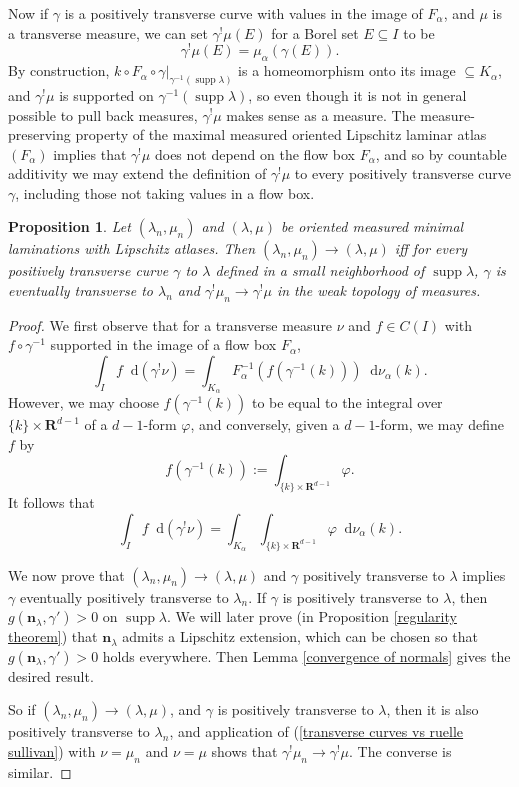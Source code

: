 \documentclass[reqno,11pt]{amsart}
\newcommand{\RR}{\mathbf{R}}
\newcommand*\dif{\mathop{}\!\mathrm{d}}
\DeclareMathOperator{\supp}{supp}
\newcommand{\normal}{\mathbf n}
\newtheorem{proposition}[theorem]{Proposition}
\theoremstyle{definition}
\numberwithin{equation}{section}
\begin{document}
Now if $\gamma$ is a positively transverse curve with values in the image of $F_\alpha$, and $\mu$ is a transverse measure, we can set $\gamma^! \mu(E)$ for a Borel set $E \subseteq I$ to be 
$$\gamma^! \mu(E) = \mu_\alpha(\gamma(E)).$$
By construction, $k \circ F_\alpha \circ \gamma|_{\gamma^{-1}(\supp \lambda)}$ is a homeomorphism onto its image $\subseteq K_\alpha$, and $\gamma^! \mu$ is supported on $\gamma^{-1}(\supp \lambda)$, so even though it is not in general possible to pull back measures, $\gamma^! \mu$ makes sense as a measure. 
The measure-preserving property of the maximal measured oriented Lipschitz laminar atlas $(F_\alpha)$ implies that $\gamma^! \mu$ does not depend on the flow box $F_\alpha$, and so by countable additivity we may extend the definition of $\gamma^! \mu$ to every positively transverse curve $\gamma$, including those not taking values in a flow box.

\begin{proposition}\label{characterization of measure convergence}
	Let $(\lambda_n, \mu_n)$ and $(\lambda, \mu)$ be oriented measured minimal laminations with Lipschitz atlases. Then $(\lambda_n, \mu_n) \to (\lambda, \mu)$ iff for every positively transverse curve $\gamma$ to $\lambda$ defined in a small neighborhood of $\supp \lambda$, $\gamma$ is eventually transverse to $\lambda_n$ and $\gamma^! \mu_n \to \gamma^! \mu$ in the weak topology of measures.
\end{proposition}
\begin{proof}
	We first observe that for a transverse measure $\nu$ and $f \in C(I)$ with $f \circ \gamma^{-1}$ supported in the image of a flow box $F_\alpha$,
	$$\int_I f \dif(\gamma^! \nu) = \int_{K_\alpha} F_\alpha^{-1}(f(\gamma^{-1}(k))) \dif \nu_\alpha(k).$$
	However, we may choose $f(\gamma^{-1}(k))$ to be equal to the integral over $\{k\} \times \RR^{d - 1}$ of a $d-1$-form $\varphi$, and conversely, given a $d-1$-form, we may define $f$ by
	$$f(\gamma^{-1}(k)) := \int_{\{k\} \times \RR^{d - 1}} \varphi.$$
	It follows that 
\begin{equation}\label{transverse curves vs ruelle sullivan}
	\int_I f \dif(\gamma^! \nu) = \int_{K_\alpha} \int_{\{k\} \times \RR^{d - 1}} \varphi \dif \nu_\alpha(k).
\end{equation}

	We now prove that $(\lambda_n, \mu_n) \to (\lambda, \mu)$ and $\gamma$ positively transverse to $\lambda$ implies $\gamma$ eventually positively transverse to $\lambda_n$.
	If $\gamma$ is positively transverse to $\lambda$, then $g(\normal_\lambda, \gamma') > 0$ on $\supp \lambda$.
	We will later prove (in Proposition \ref{regularity theorem}) that $\normal_\lambda$ admits a Lipschitz extension, which can be chosen so that $g(\normal_\lambda, \gamma') > 0$ holds everywhere.
	Then Lemma \ref{convergence of normals} gives the desired result.

	So if $(\lambda_n, \mu_n) \to (\lambda, \mu)$, and $\gamma$ is positively transverse to $\lambda$, then it is also positively transverse to $\lambda_n$, and application of (\ref{transverse curves vs ruelle sullivan}) with $\nu = \mu_n$ and $\nu = \mu$ shows that $\gamma^! \mu_n \to \gamma^! \mu$. 
	The converse is similar.
\end{proof}
\end{document}
